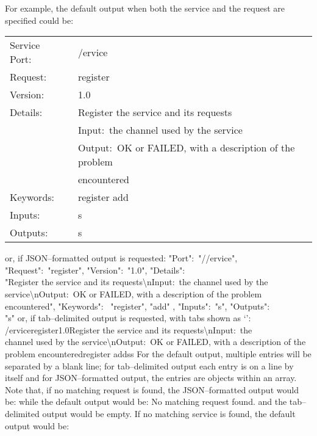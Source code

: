 For example, the default output when both the service and the request are specified could
be:
\outputBegin{}
\begin{tabular}{l@{\ }p{12.8cm}}
Service Port:\ & /\textdollar{}ervice\\
Request:\ & register\\
Version:\ & 1.0\\
Details:\ & Register the service and its requests\\
 & Input:\ the channel used by the service\\
 & Output:\ OK or FAILED, with a description of the problem\\
 & encountered\\
Keywords:\ & register add\\
Inputs:\ & s\\
Outputs:\ & s\\
\end{tabular}
\outputEnd{}
or, if JSON--formatted output is requested:
\outputBegin{}
\openSq{} \textbraceleft{} "Port":\ "//\textdollar{}ervice", "Request":\ "register",
"Version":\ "1.0", "Details":\ \\
"Register the service and its requests\textbackslash{}nInput:\ the channel used by the\\
service\textbackslash{}nOutput:\ OK or FAILED, with a description of the problem\\
encountered", "Keywords":\ \openSq{} "register", "add" \closeSq, "Inputs":\ "s",
"Outputs":\ \\
"s" \textbraceright{} \closeSq
\outputEnd{}
or, if tab--delimited output is requested, with tabs shown as
`\texttt{\boldmath{$\vdash$}}':
\outputBegin{}
/\textdollar{}ervice\pseudotab{}register\pseudotab{}1.0\pseudotab{}Register the service
and its requests\textbackslash{}nInput:\ the\\
channel used by the service\textbackslash{}nOutput:\ OK or FAILED, with a description of
the\\
problem encountered\pseudotab{}register add\pseudotab{}s\pseudotab{}s
\outputEnd{}
For the default output, multiple entries will be separated by a blank line; for
tab--delimited output each entry is on a line by itself and for JSON--formatted output,
the entries are objects within an array.
Note that, if no matching request is found, the JSON--formatted output would be:
\outputBegin{}
\sqPair
\outputEnd{}
while the default output would be:
\outputBegin{}
No matching request found.
\outputEnd{}
and the tab--delimited output would be empty.
If no matching service is found, the default output would be:
